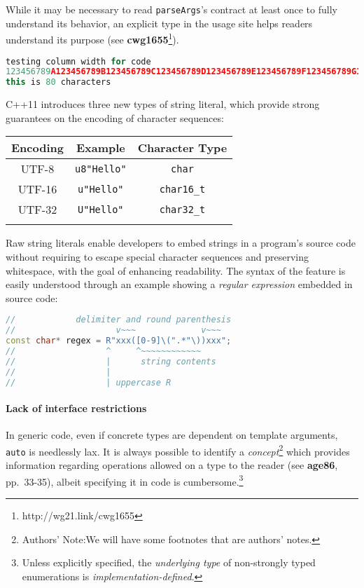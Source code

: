 \documentclass[twoside,10pt,letterpaper,usenames]{newstyle-PearsonGeneric-7-38}
\newcommand{\authorsnote}{Authors' Note:}
\let\Begin\begin
\let\End\end
\begin{document}
While it may be necessary to read \texttt{parseArgs}'s contract at least
once to fully understand its behavior, an explicit type in the usage
site helps readers understand its purpose (see
\textbf{{cwg1655}}{\cprotect\footnote{http://wg21.link/cwg1655}}).

\begin{lstlisting}[language=C++]
testing column width for code
123456789A123456789B123456789C123456789D123456789E123456789F123456789G123456789H
this is 80 characters
\end{lstlisting}
    

C++11 introduces three new types of string literal, which provide strong
guarantees on the encoding of character sequences:

\Begin{center}
\Begin{tabular}{c|c|c}
\thickhline

\textbf{Encoding} & \textbf{Example} & \textbf{Character Type} \\ \hline
UTF-8 & \texttt{u8"Hello"} & \texttt{char} \\ \hline UTF-16 &
\texttt{u"Hello"} & \texttt{char16\_t} \\ \hline UTF-32 &
\texttt{U"Hello"} & \texttt{char32\_t} \\

\thickhline
\End{tabular}
\End{center}

Raw string literals enable developers to embed strings in a program's
source code without requiring to escape special character sequences and
preserving whitespace, with the goal of enhancing readability. The
syntax of the feature is easily understood through an example showing a
\emph{regular expression} embedded in source code:

\begin{lstlisting}[language=C++]
//            delimiter and round parenthesis
//                    v~~~             v~~~
const char* regex = R"xxx([0-9]\(".*"\))xxx";
//                  ^     ^~~~~~~~~~~~~
//                  |      string contents
//                  |
//                  | uppercase R
\end{lstlisting}
    

\paragraph[Lack of interface restrictions]{Lack of interface restrictions}\label{lack-of-interface-restrictions}

In generic code, even if concrete types are dependent on template
arguments, \texttt{auto} is needlessly lax. It is always possible to
identify a \emph{concept}{\cprotect\footnote{\authorsnote We will have
some footnotes that are authors' notes.}} which provides information
regarding operations allowed on a type to the reader (see
\textbf{{age86}}, pp.~33-35), albeit specifying it in code is
cumbersome.{\cprotect\footnote{Unless explicitly specified, the
\emph{underlying type} of non-strongly typed enumerations is
\emph{implementation-defined}.}}
\end{document}
